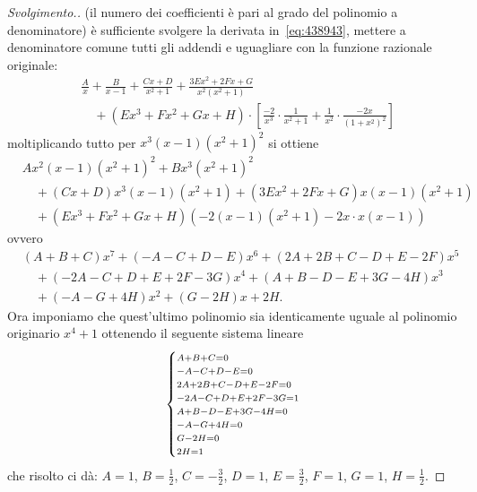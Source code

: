 \begin{proof}[Svolgimento.]
(il numero dei coefficienti è pari al grado del polinomio a denominatore) 
è sufficiente svolgere la derivata in~\eqref{eq:438943}, 
mettere a denominatore comune tutti gli addendi 
e uguagliare con la funzione razionale originale:
\begin{align*}
  &\frac{A}{x} + \frac{B}{x-1} + \frac{Cx+D}{x^2+1}
  + \frac{3 E x^2 + 2 F x + G}{x^2(x^2+1)} \\
  & \quad + (E x^3 + F x^2 + G x + H)\cdot \left[\frac{-2}{x^3}\cdot \frac{1}{x^2+1}
  + \frac{1}{x^2}\cdot\frac{-2x}{(1+x^2)^2}\right]
\end{align*}
moltiplicando tutto per $x^3(x-1)(x^2+1)^2$ si ottiene
\begin{align*}
  &Ax^2(x-1)(x^2+1)^2 + Bx^3(x^2+1)^2 \\
  &\quad + (Cx+D)x^3(x-1)(x^2+1) + (3Ex^2+2Fx+G)x(x-1)(x^2+1)\\
  &\quad + (Ex^3+Fx^2+Gx+H)(-2(x-1)(x^2+1)-2x\cdot x(x-1))
\end{align*}
ovvero
\begin{align*}
  &(A+B+C)x^7+(-A-C+D-E)x^6 + (2A+2B+C-D+E-2F)x^5 \\
  &\quad  +(-2A-C+D+E+2F-3G)x^4 + (A+B-D-E+3G-4H)x^3 \\
  &\quad  + (-A-G+4H)x^2 + (G-2H) x + 2H.
\end{align*}
Ora imponiamo che quest'ultimo polinomio sia identicamente uguale
al polinomio originario $x^4+1$ ottenendo il seguente sistema lineare
\[
  \begin{dcases}
    \scriptstyle
    A+B+C=0 \\[-1ex]
    \scriptstyle
    -A-C+D-E=0 \\[-1ex]
    \scriptstyle
    2A + 2B + C - D + E - 2 F = 0\\[-1ex]
    \scriptstyle
    -2A-C+D+E+2F-3G = 1\\[-1ex]
    \scriptstyle
    A+B-D-E+3G-4H=0\\[-1ex]
    \scriptstyle
    -A-G+4H=0\\[-1ex]
    \scriptstyle
    G-2H=0\\[-1ex]
    \scriptstyle
    2H=1
  \end{dcases}
\]
che risolto ci dà: $A=1$, $B=\frac 1 2$, $C = -\frac 3 2$, $D=1$, $E=\frac 3 2$, $F=1$, $G=1$, $H=\frac 1 2$.

\end{proof}

